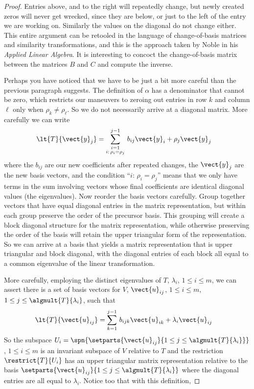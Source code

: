 \begin{proof}
Entries above, and to the right will repeatedly change, but newly created zeros will never get wrecked, since they are below, or just to the left of the entry we are working on.  Similarly the values on the diagonal do not change either.   This entire argument can be retooled in the language of change-of-basis matrices and similarity transformations, and this is the approach taken by Noble in his {\sl Applied Linear Algebra}.  It is interesting to concoct the change-of-basis matrix between the matrices $B$ and $C$ and compute the inverse.\par
%
Perhaps you have noticed that we have to be just a bit more careful than the previous paragraph suggests.  The definition of $\alpha$ has a denominator that cannot be zero, which restricts our maneuvers to zeroing out entries in row $k$ and column $\ell$ only when $\rho_k\neq\rho_\ell$.   So we do not necessarily arrive at a diagonal matrix.  More carefully we can write
%
\begin{align*}
\lt{T}{\vect{y}_j}&=\sum_{\substack{i=1\\i:\,\rho_i=\rho_j}}^{j-1}\,b_{ij}\vect{y}_i + \rho_j\vect{y}_j
\end{align*}
%
where the $b_{ij}$ are our new coefficients after repeated changes, the $\vect{y}_j$ are the new basis vectors, and the condition ``$i:\,\rho_i=\rho_j$'' means that we only have terms in the sum involving vectors whose final coefficients are identical diagonal values (the eigenvalues).   Now reorder the basis vectors carefully.  Group together vectors that have equal diagonal entries in the matrix representation, but within each group preserve the order of the precursor basis.  This grouping will create a block diagonal structure for the matrix representation, while otherwise preserving the order of the basis will retain the upper triangular form of the representation.
So we can arrive at a basis that yields a matrix representation that is upper triangular and block diagonal, with the diagonal entries of each block all equal to a common eigenvalue of the linear transformation.\par
%
More carefully, employing the distinct eigenvalues of $T$, $\lambda_i$, $1\leq i\leq m$, we can assert there is a set of basis vectors for $V$, $\vect{u}_{ij}$, $1\leq i\leq m$, $1\leq j\leq\algmult{T}{\lambda_i}$, such that
%
\begin{align*}
\lt{T}{\vect{u}_{ij}}&=\sum_{k=1}^{j-1}\,b_{ijk}\vect{u}_{ik} + \lambda_i\vect{u}_{ij}
\end{align*}
%
So the subspace $U_i=\spn{\setparts{\vect{u}_{ij}}{1 \leq j\leq\algmult{T}{\lambda_i}}}$, $1\leq i\leq m$  is an invariant subspace of $V$ relative to $T$ and the restriction $\restrict{T}{U_i}$ has an upper triangular matrix representation relative to the basis $\setparts{\vect{u}_{ij}}{1 \leq j\leq\algmult{T}{\lambda_i}}$ where the diagonal entries are all equal to $\lambda_i$.  Notice too that with this definition,

\end{proof}
